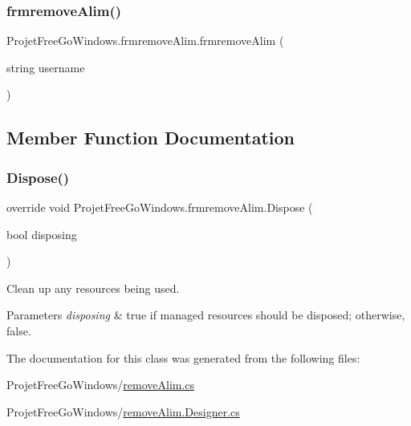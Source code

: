 \subsubsection{\texorpdfstring{frmremove\+Alim()}{frmremoveAlim()}}
{\footnotesize\ttfamily Projet\+Free\+Go\+Windows.\+frmremove\+Alim.\+frmremove\+Alim (\begin{DoxyParamCaption}\item[{string}]{username }\end{DoxyParamCaption})}



\subsection{Member Function Documentation}
\mbox{\label{class_projet_free_go_windows_1_1frmremove_alim_a9a7d2ae9551b3bc12df2f4b995006b39}} 
\subsubsection{\texorpdfstring{Dispose()}{Dispose()}}
{\footnotesize\ttfamily override void Projet\+Free\+Go\+Windows.\+frmremove\+Alim.\+Dispose (\begin{DoxyParamCaption}\item[{bool}]{disposing }\end{DoxyParamCaption})\hspace{0.3cm}{\ttfamily [protected]}}



Clean up any resources being used. 


\begin{DoxyParams}{Parameters}
{\em disposing} & true if managed resources should be disposed; otherwise, false.\\
\hline
\end{DoxyParams}


The documentation for this class was generated from the following files\+:\begin{DoxyCompactItemize}
\item 
Projet\+Free\+Go\+Windows/\hyperlink{remove_alim_8cs}{remove\+Alim.\+cs}\item 
Projet\+Free\+Go\+Windows/\hyperlink{remove_alim_8_designer_8cs}{remove\+Alim.\+Designer.\+cs}\end{DoxyCompactItemize}
